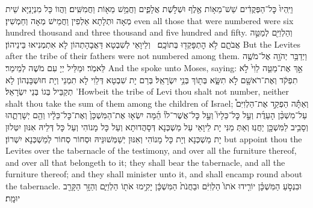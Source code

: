 {וַיִּֽהְיוּ֙ כׇּל־הַפְּקֻדִ֔ים שֵׁשׁ־מֵא֥וֹת אֶ֖לֶף וּשְׁלֹ֣שֶׁת אֲלָפִ֑ים וַחֲמֵ֥שׁ מֵא֖וֹת וַחֲמִשִּֽׁים׃}
{וַהֲווֹ כָּל מִנְיָנַיָּא שֵׁית מְאָה וּתְלָתָא אַלְפִין וַחֲמֵישׁ מְאָה וְחַמְשִׁין׃}
{even all those that were numbered were six hundred thousand and three thousand and five hundred and fifty.}{}
{וְהַלְוִיִּ֖ם לְמַטֵּ֣ה אֲבֹתָ֑ם לֹ֥א הׇתְפָּקְד֖וּ בְּתוֹכָֽם׃ \petucha }
{וְלֵיוָאֵי לְשִׁבְטָא דַּאֲבָהָתְהוֹן לָא אִתְמְנִיאוּ בֵּינֵיהוֹן׃}
{But the Levites after the tribe of their fathers were not numbered among them.}{}
{וַיְדַבֵּ֥ר יְהֹוָ֖ה אֶל־מֹשֶׁ֥ה לֵּאמֹֽר׃}
{וּמַלֵּיל יְיָ עִם מֹשֶׁה לְמֵימַר׃}
{And the \lord\space spoke unto Moses, saying:}{}
{אַ֣ךְ אֶת־מַטֵּ֤ה לֵוִי֙ לֹ֣א תִפְקֹ֔ד וְאֶת־רֹאשָׁ֖ם לֹ֣א תִשָּׂ֑א בְּת֖וֹךְ בְּנֵ֥י יִשְׂרָאֵֽל׃
}
{בְּרַם יָת שִׁבְטָא דְּלֵוִי לָא תִמְנֵי וְיָת חוּשְׁבָּנְהוֹן לָא תְקַבֵּיל בְּגוֹ בְּנֵי יִשְׂרָאֵל׃}
{’Howbeit the tribe of Levi thou shalt not number, neither shalt thou take the sum of them among the children of Israel;}{}
{וְאַתָּ֡ה הַפְקֵ֣ד אֶת־הַלְוִיִּם֩ עַל־מִשְׁכַּ֨ן הָעֵדֻ֜ת וְעַ֣ל כׇּל־כֵּלָיו֮ וְעַ֣ל כׇּל־אֲשֶׁר־לוֹ֒ הֵ֜מָּה יִשְׂא֤וּ אֶת־הַמִּשְׁכָּן֙ וְאֶת־כׇּל־כֵּלָ֔יו וְהֵ֖ם יְשָׁרְתֻ֑הוּ וְסָבִ֥יב לַמִּשְׁכָּ֖ן יַחֲנֽוּ׃
}
{וְאַתְּ מַנִּי יָת לֵיוָאֵי עַל מַשְׁכְּנָא דְּסָהֲדוּתָא וְעַל כָּל מָנוֹהִי וְעַל כָּל דְּלֵיהּ אִנּוּן יִטְּלוּן יָת מַשְׁכְּנָא וְיָת כָּל מָנוֹהִי וְאִנּוּן יְשַׁמְּשׁוּנֵּיהּ וּסְחוֹר סְחוֹר לְמַשְׁכְּנָא יִשְׁרוֹן׃}
{but appoint thou the Levites over the tabernacle of the testimony, and over all the furniture thereof, and over all that belongeth to it; they shall bear the tabernacle, and all the furniture thereof; and they shall minister unto it, and shall encamp round about the tabernacle.}{}
{וּבִנְסֹ֣עַ הַמִּשְׁכָּ֗ן יוֹרִ֤ידוּ אֹתוֹ֙ הַלְוִיִּ֔ם וּבַחֲנֹת֙ הַמִּשְׁכָּ֔ן יָקִ֥ימוּ אֹת֖וֹ הַלְוִיִּ֑ם וְהַזָּ֥ר הַקָּרֵ֖ב יוּמָֽת׃
}
